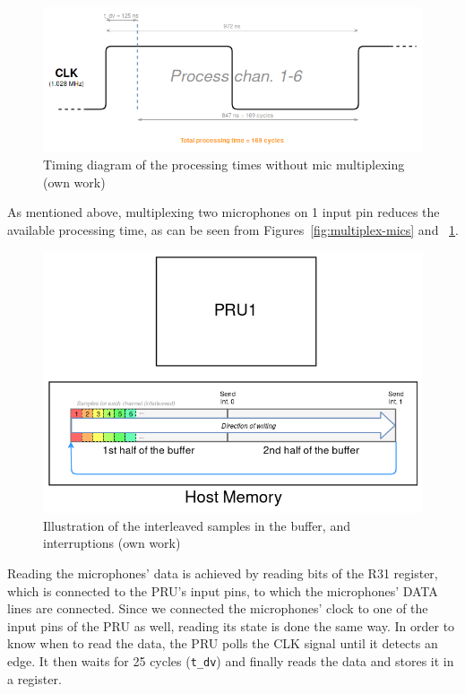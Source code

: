 \documentclass[]{report}
\begin{document}
\begin{figure}[H]
\centering
\includegraphics[width=1.0\linewidth]{Pictures/PRU_timing_diagram_no_mic_multiplexing.png}
\caption{Timing diagram of the processing times without mic
multiplexing (own work)}
\label{fig:nonmultiplex-mics}
\end{figure}

As mentioned above, multiplexing two microphones on 1 input pin reduces
the available processing time, as can be seen from Figures~\ref{fig:multiplex-mics} and ~\ref{fig:nonmultiplex-mics}.

\begin{figure}
\centering
\includegraphics[width=0.8\linewidth]{Pictures/PRU_buffer.png}
\caption{Illustration of the interleaved samples in the buffer, and
interruptions (own work)}
\end{figure}

Reading the microphones' data is achieved by reading bits of the R31 register, which is connected to the PRU's input pins, to which the microphones' DATA lines are connected. Since we connected the microphones' clock to one of the input pins of the PRU as well, reading its state is done the same way. In order to know when to read the data, the PRU polls the CLK signal until it detects an edge. It then waits for 25 cycles (\texttt{t\_dv}) and finally reads the data and stores it in a register.
\end{document}
